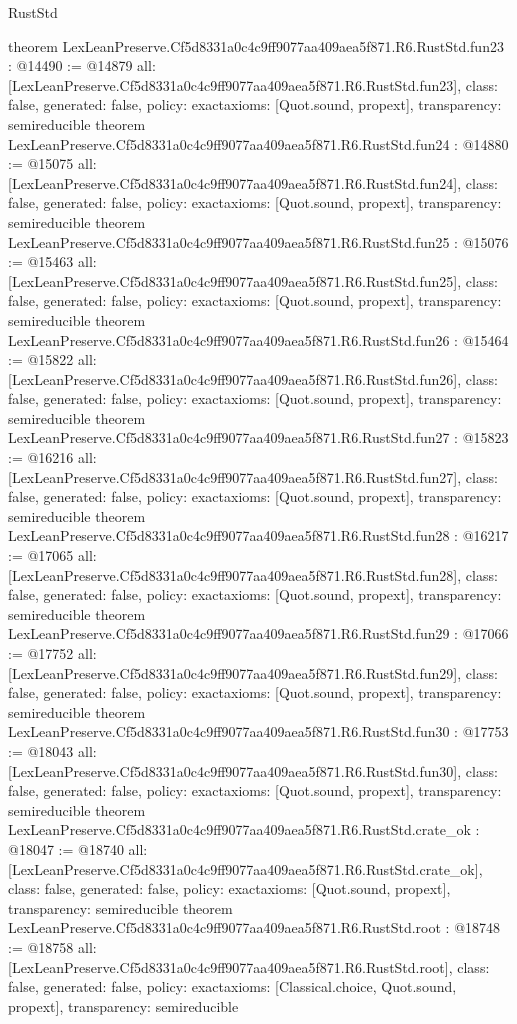 \begin{lexlean}{RustStd}
\begin{coremodule}
{}
theorem LexLeanPreserve.Cf5d8331a0c4c9ff9077aa409aea5f871.R6.RustStd.fun23 : @14490 := @14879 {
  all: [LexLeanPreserve.Cf5d8331a0c4c9ff9077aa409aea5f871.R6.RustStd.fun23],
  class: false,
  generated: false,
  policy: exact{axioms: [Quot.sound, propext]},
  transparency: semireducible
}
theorem LexLeanPreserve.Cf5d8331a0c4c9ff9077aa409aea5f871.R6.RustStd.fun24 : @14880 := @15075 {
  all: [LexLeanPreserve.Cf5d8331a0c4c9ff9077aa409aea5f871.R6.RustStd.fun24],
  class: false,
  generated: false,
  policy: exact{axioms: [Quot.sound, propext]},
  transparency: semireducible
}
theorem LexLeanPreserve.Cf5d8331a0c4c9ff9077aa409aea5f871.R6.RustStd.fun25 : @15076 := @15463 {
  all: [LexLeanPreserve.Cf5d8331a0c4c9ff9077aa409aea5f871.R6.RustStd.fun25],
  class: false,
  generated: false,
  policy: exact{axioms: [Quot.sound, propext]},
  transparency: semireducible
}
theorem LexLeanPreserve.Cf5d8331a0c4c9ff9077aa409aea5f871.R6.RustStd.fun26 : @15464 := @15822 {
  all: [LexLeanPreserve.Cf5d8331a0c4c9ff9077aa409aea5f871.R6.RustStd.fun26],
  class: false,
  generated: false,
  policy: exact{axioms: [Quot.sound, propext]},
  transparency: semireducible
}
theorem LexLeanPreserve.Cf5d8331a0c4c9ff9077aa409aea5f871.R6.RustStd.fun27 : @15823 := @16216 {
  all: [LexLeanPreserve.Cf5d8331a0c4c9ff9077aa409aea5f871.R6.RustStd.fun27],
  class: false,
  generated: false,
  policy: exact{axioms: [Quot.sound, propext]},
  transparency: semireducible
}
theorem LexLeanPreserve.Cf5d8331a0c4c9ff9077aa409aea5f871.R6.RustStd.fun28 : @16217 := @17065 {
  all: [LexLeanPreserve.Cf5d8331a0c4c9ff9077aa409aea5f871.R6.RustStd.fun28],
  class: false,
  generated: false,
  policy: exact{axioms: [Quot.sound, propext]},
  transparency: semireducible
}
theorem LexLeanPreserve.Cf5d8331a0c4c9ff9077aa409aea5f871.R6.RustStd.fun29 : @17066 := @17752 {
  all: [LexLeanPreserve.Cf5d8331a0c4c9ff9077aa409aea5f871.R6.RustStd.fun29],
  class: false,
  generated: false,
  policy: exact{axioms: [Quot.sound, propext]},
  transparency: semireducible
}
theorem LexLeanPreserve.Cf5d8331a0c4c9ff9077aa409aea5f871.R6.RustStd.fun30 : @17753 := @18043 {
  all: [LexLeanPreserve.Cf5d8331a0c4c9ff9077aa409aea5f871.R6.RustStd.fun30],
  class: false,
  generated: false,
  policy: exact{axioms: [Quot.sound, propext]},
  transparency: semireducible
}
theorem LexLeanPreserve.Cf5d8331a0c4c9ff9077aa409aea5f871.R6.RustStd.crate_ok : @18047 := @18740 {
  all: [LexLeanPreserve.Cf5d8331a0c4c9ff9077aa409aea5f871.R6.RustStd.crate_ok],
  class: false,
  generated: false,
  policy: exact{axioms: [Quot.sound, propext]},
  transparency: semireducible
}
theorem LexLeanPreserve.Cf5d8331a0c4c9ff9077aa409aea5f871.R6.RustStd.root : @18748 := @18758 {
  all: [LexLeanPreserve.Cf5d8331a0c4c9ff9077aa409aea5f871.R6.RustStd.root],
  class: false,
  generated: false,
  policy: exact{axioms: [Classical.choice, Quot.sound, propext]},
  transparency: semireducible
}


\end{coremodule}
\end{lexlean}
